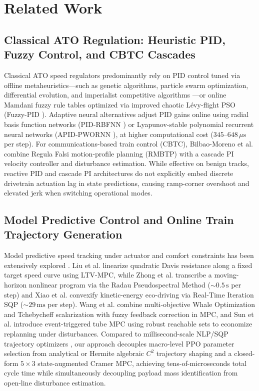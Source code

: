 \documentclass[10pt,a4paper]{article}
\begin{document}
\section{Related Work}
\label{sec:related_work}

\subsection{Classical ATO Regulation: Heuristic PID, Fuzzy Control, and CBTC Cascades}
Classical ATO speed regulators predominantly rely on PID control tuned via offline metaheuristics—such as genetic algorithms, particle swarm optimization, differential evolution, and imperialist competitive algorithms \cite{ref1}—or online Mamdani fuzzy rule tables optimized via improved chaotic L\'evy-flight PSO (Fuzzy-PID \cite{ref29}). Adaptive neural alternatives adjust PID gains online using radial basis function networks (PID-RBFNN \cite{ref20}) or Lyapunov-stable polynomial recurrent neural networks (APID-PWORNN \cite{ref19}), at higher computational cost ($345\text{--}648\,\mu\text{s}$ per step). For communications-based train control (CBTC), Bilbao-Moreno et al. \cite{ref17} combine Regula Falsi motion-profile planning (RMBTP) with a cascade PI velocity controller and disturbance estimation. While effective on benign tracks, reactive PID and cascade PI architectures do not explicitly embed discrete drivetrain actuation lag in state predictions, causing ramp-corner overshoot and elevated jerk when switching operational modes.

\subsection{Model Predictive Control and Online Train Trajectory Generation}
Model predictive speed tracking under actuator and comfort constraints has been extensively explored \cite{ref2, ref15, ref16, ref18, ref21}. Liu et al. \cite{ref2} linearize quadratic Davis resistance along a fixed target speed curve using LTV-MPC, while Zhong et al. \cite{ref15} transcribe a moving-horizon nonlinear program via the Radau Pseudospectral Method ($\sim 0.5\,\text{s}$ per step) and Xiao et al. \cite{ref16} convexify kinetic-energy eco-driving via Real-Time Iteration SQP ($\sim 29\,\text{ms}$ per step). Wang et al. \cite{ref21} combine multi-objective Whale Optimization and Tchebycheff scalarization with fuzzy feedback correction in MPC, and Sun et al. \cite{ref18} introduce event-triggered tube MPC using robust reachable sets to economize replanning under disturbances. Compared to millisecond-scale NLP/SQP trajectory optimizers \cite{ref15, ref16}, our approach decouples macro-level PPO parameter selection from analytical or Hermite algebraic $C^2$ trajectory shaping and a closed-form $5\times 3$ state-augmented Cramer MPC, achieving tens-of-microseconds total cycle time while simultaneously decoupling payload mass identification from open-line disturbance estimation.
\end{document}

